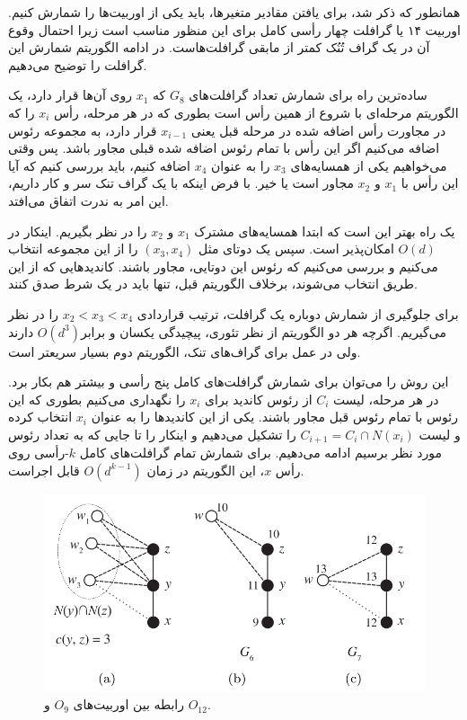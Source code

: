 همانطور که ذکر شد، برای یافتن مقادیر متغیرها، باید یکی از اوربیت‌ها را شمارش کنیم. اوربیت ۱۴ یا گرافلت چهار رأسی کامل برای این منظور مناسب است زیرا احتمال وقوع آن در یک گراف تُنُک کمتر از مابقی گرافلت‌هاست. در ادامه الگوریتم شمارش این گرافلت را توضیح می‌دهیم.

ساده‌ترین راه برای شمارش تعداد گرافلت‌های $G_8$ که $x_1$ روی آن‌ها قرار دارد، یک الگوریتم مرحله‌ای با شروع از همین رأس است بطوری که در هر مرحله، رأس $x_i$ را که در مجاورت رأس اضافه شده در مرحله قبل یعنی $x_{i-1}$ قرار دارد، به مجموعه رئوس اضافه می‌کنیم اگر این رأس با تمام رئوس اضافه شده قبلی مجاور باشد. پس وقتی می‌خواهیم یکی از همسایه‌های $x_3$ را به عنوان $x_4$ اضافه کنیم، باید بررسی کنیم که آیا این رأس با $x_1$ و $x_2$ مجاور است یا خیر. با فرض اینکه با یک گراف تنک سر و کار داریم، این امر به ندرت اتفاق می‌افتد.

یک راه بهتر این است که ابتدا همسایه‌های مشترک $x_1$ و $x_2$ را در نظر بگیریم. اینکار در $O(d)$ امکان‌پذیر است. سپس یک دوتای مثل $(x_3,x_4)$ را از این مجموعه انتخاب می‌کنیم و بررسی می‌کنیم که رئوس این دوتایی، مجاور باشند. کاندید‌هایی که از این طریق انتخاب می‌شوند، برخلاف الگوریتم قبل، تنها باید در یک شرط صدق کنند.

برای جلوگیری از شمارش دوباره یک گرافلت، ترتیب قراردادی $x_2 < x_3 < x_4$ را در نظر می‌گیریم. اگرچه هر دو الگوریتم از نظر تئوری، پیچیدگی یکسان و برابر$O(d^3)$ دارند ولی در عمل برای گراف‌های تنک، الگوریتم دوم بسیار سریعتر است.

این روش را می‌توان برای شمارش گرافلت‌های کامل پنج رأسی و بیشتر هم بکار برد. در هر مرحله، لیست $C_i$ از رئوس کاندید برای $x_i$ را نگهداری می‌کنیم بطوری که این رئوس با تمام رئوس قبل مجاور باشند. یکی از این کاندیدها را به عنوان $x_i$ انتخاب کرده و لیست $C_{i+1} = C_i\cap N(x_i)$ را تشکیل می‌دهیم و اینکار را تا جایی که به تعداد رئوس مورد نظر برسیم ادامه می‌دهیم. برای شمارش تمام گرافلت‌های کامل $k$-رأسی روی رأس $x$، این الگوریتم در زمان $O(d^{k-1})$ قابل اجراست.

\begin{figure}[b]
\centering
\includegraphics[scale=0.3]{./4-node-graphlet-1.png}
\caption{رابطه بین اوربیت‌های $O_9$ و $O_{12}$.}
\label{fig:o9-o12-relation}
\end{figure}

